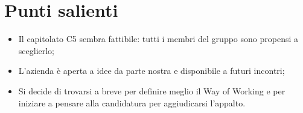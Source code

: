 \documentclass[11pt]{article}
\begin{document}
	\newpage
	
	\section{Punti salienti}
		\begin{itemize}
			\item Il capitolato C5 sembra fattibile: tutti i membri del gruppo sono propensi a sceglierlo;
			\item L'azienda è aperta a idee da parte nostra e disponibile a futuri incontri;
			\item Si decide di trovarsi a breve per definire meglio il Way of Working e per iniziare a pensare alla
			candidatura per aggiudicarsi l'appalto.
		\end{itemize}

	
	
\end{document}
